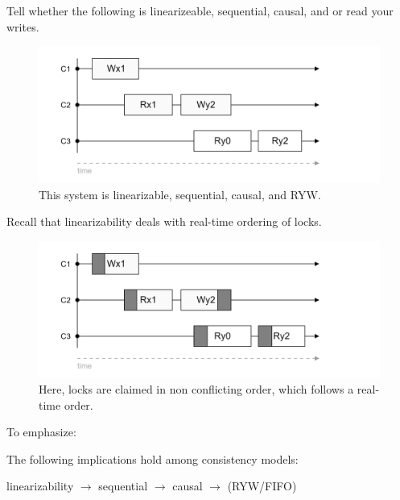 \noindent
Tell whether the following is linearizeable, sequential, causal, and or read your writes.
\begin{figure}[h]
    \centering
    \includegraphics[width=.9\textwidth]{Sections/consist/test.png}
    \caption{This system is linearizable, sequential, causal, and RYW.}
\end{figure}

\newpage 

\noindent
Recall that linearizability deals with real-time ordering of locks.
\begin{figure}[h]
    \centering
    \includegraphics[width=.9\textwidth]{Sections/consist/test_2.png}
    \caption{Here, locks are claimed in non conflicting order, which follows a real-time order.}
\end{figure}

\noindent
To emphasize:
\begin{theo}

    The following implications hold among consistency models:

    \begin{center}
        linearizability $\rightarrow$ sequential $\rightarrow$ causal $\rightarrow$ (RYW/FIFO)
    \end{center}
\end{theo}


    
